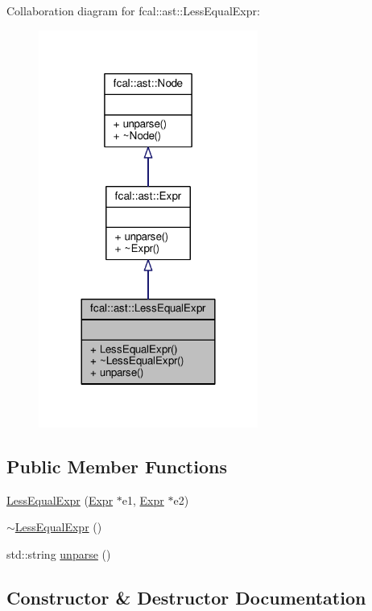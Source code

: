 Collaboration diagram for fcal\+:\+:ast\+:\+:Less\+Equal\+Expr\+:
\nopagebreak
\begin{figure}[H]
\begin{center}
\leavevmode
\includegraphics[width=204pt]{classfcal_1_1ast_1_1LessEqualExpr__coll__graph}
\end{center}
\end{figure}
\subsection*{Public Member Functions}
\begin{DoxyCompactItemize}
\item 
\hyperlink{classfcal_1_1ast_1_1LessEqualExpr_af2ed0f19ebe90dad9f09620719ca388f}{Less\+Equal\+Expr} (\hyperlink{classfcal_1_1ast_1_1Expr}{Expr} $\ast$e1, \hyperlink{classfcal_1_1ast_1_1Expr}{Expr} $\ast$e2)
\item 
\hyperlink{classfcal_1_1ast_1_1LessEqualExpr_a33d3a192e3fc66006ec313ad54dfe2de}{$\sim$\+Less\+Equal\+Expr} ()
\item 
std\+::string \hyperlink{classfcal_1_1ast_1_1LessEqualExpr_a78181c2bc69a185d97753d23c823b6a0}{unparse} ()
\end{DoxyCompactItemize}


\subsection{Constructor \& Destructor Documentation}
